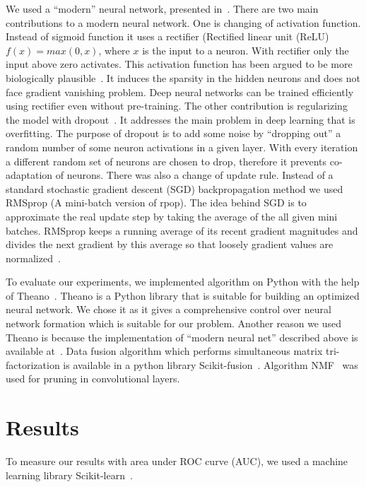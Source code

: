 \documentclass{article} %
\begin{document}
We used a “modern” neural network, presented in~\cite{github}. There are two
main contributions to a modern neural network. One is changing of activation
function. Instead of sigmoid function it uses a rectifier (Rectified linear 
unit (ReLU) $f(x) = max(0, x)$, where $x$ is the input to a neuron. With
rectifier only the input above zero activates. This
activation function has been argued to be more biologically
plausible~\cite{AISTATS2011_GlorotBB11}. It induces the sparsity in the hidden
neurons and does not face gradient vanishing problem. Deep neural networks
can be trained efficiently using rectifier even without pre-training. 
The other contribution is regularizing the model with
dropout~\cite{srivastava2014dropout}. It addresses
the main problem in deep learning that is overfitting. The purpose of dropout
is to add some noise by “dropping out” a random number of some neuron
activations in a given layer. With every iteration a different random set of
neurons are chosen to drop, therefore it prevents co-adaptation of neurons.
There was also a change of update rule. Instead of a standard stochastic
gradient descent (SGD) backpropagation method we used RMSprop (A mini-batch
version of rpop). The idea behind SGD is to approximate the real update step by
taking the average of the all given mini batches.
RMSprop keeps a running average of its recent gradient magnitudes and divides
the next gradient by this average so that loosely gradient values are
normalized~\cite{lecture}. 

To evaluate our experiments, we implemented algorithm on Python with the help
of Theano~\cite{Bastien-Theano-2012, bergstra+al:2010-scipy}. Theano is a
Python library that is suitable for building an optimized neural network. We
chose it as it gives a comprehensive control over neural network formation
which is suitable for our problem. Another reason we used Theano is because the
implementation of “modern neural net” described above is available 
at~\cite{github}.
Data fusion algorithm which performs simultaneous matrix
tri-factorization is available in a python library
Scikit-fusion~\cite{zitnik2015data}. Algorithm NMF~\cite{Zitnik2012} was used for 
pruning in convolutional layers.


\section{Results}
 To measure our results with area under ROC 
curve (AUC), we used a machine
learning library Scikit-learn~\cite{scikit-learn}.
\end{document}
